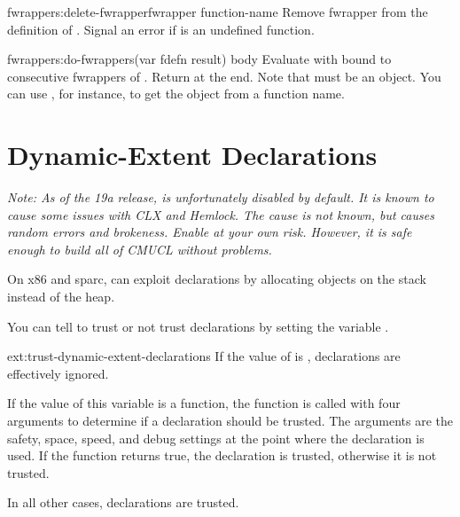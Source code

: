 \begin{defun}{fwrappers:}{delete-fwrapper}{fwrapper function-name}
  Remove fwrapper  from the definition of
  .  Signal an error if  is an
  undefined function.
\end{defun}

\begin{defmac}{fwrappers:}{do-fwrappers}{(var fdefn \ampoptional{}
  result) \ampbody{} body}
  Evaluate  with  bound to consecutive fwrappers of
  .  Return  at the end.  Note that 
  must be an  object.  You can use
  , for instance, to get the 
  object from a function name.
\end{defmac}

\section{Dynamic-Extent Declarations}

\emph{Note:  As of the 19a release,  is
  unfortunately disabled by default.  It is known to cause some issues
  with CLX and Hemlock.  The cause is not known, but causes random
  errors and brokeness.  Enable at your own risk.  However, it is safe
  enough to build all of CMUCL without problems.}

On x86 and sparc, \cmucl{} can exploit 
declarations by allocating objects on the stack instead of the heap.

You can tell \cmucl{} to trust or not trust 
declarations by setting the variable
.

\begin{defvar}{ext:}{trust-dynamic-extent-declarations}
  If the value of  is 
  ,  declarations are effectively
  ignored.

  If the value of this variable is a function, the function is called
  with four arguments to determine if a  
  declaration should be trusted.  The arguments are the safety,
  space, speed, and debug settings at the point where the 
   declaration is used.  If the function
  returns true, the declaration is trusted, otherwise it is not
  trusted.

  In all other cases,  declarations are
  trusted.
\end{defvar}

